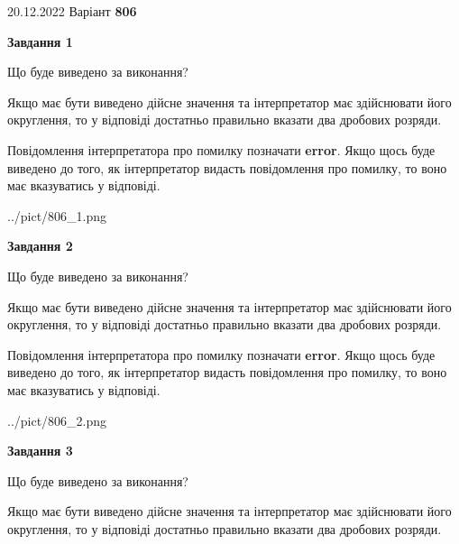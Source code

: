 \documentclass[12pt, ukrainian]{article}
\begin{document}
{20.12.2022 Варіант \No \textbf { 806 }\par}
{
\begin {Large}

{\begin {center}\textbf{Завдання 1}\end {center}}\par
Що буде виведено за виконання? \par

Якщо має бути виведено дійсне значення та інтерпретатор має здійснювати його округлення, 
то у відповіді достатньо правильно вказати два дробових розряди.

Повідомлення інтерпретатора про помилку позначати \textbf{error}.
Якщо щось буде виведено до того, як інтерпретатор видасть повідомлення про помилку, 
то воно має вказуватись у відповіді. \par

\begin{center}
	{../pict/806_1.png}
\end{center}
\newpage

{\begin {center}\textbf{Завдання 2}\end {center}}\par
Що буде виведено за виконання? \par

Якщо має бути виведено дійсне значення та інтерпретатор має здійснювати його округлення, 
то у відповіді достатньо правильно вказати два дробових розряди.

Повідомлення інтерпретатора про помилку позначати \textbf{error}.
Якщо щось буде виведено до того, як інтерпретатор видасть повідомлення про помилку, 
то воно має вказуватись у відповіді. \par

\begin{center}
	{../pict/806_2.png}
\end{center}
\newpage

{\begin {center}\textbf{Завдання 3}\end {center}}\par
Що буде виведено за виконання? \par

Якщо має бути виведено дійсне значення та інтерпретатор має здійснювати його округлення, 
то у відповіді достатньо правильно вказати два дробових розряди.


\end{Large}}
\end{document}
